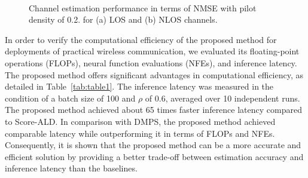 \documentclass[lettersize,journal]{IEEEtran}
\begin{document}
\begin{figure}[!t]
\\
\caption{Channel estimation performance in terms of NMSE with pilot density of 0.2. for (a) LOS and (b) NLOS channels.}
\label{fig_sim_2}
\end{figure}

In order to verify the computational efficiency of the proposed method for deployments of practical wireless communication, we evaluated its floating-point operations (FLOPs), neural function evaluations (NFEs), and inference latency. The proposed method offers significant advantages in computational efficiency, as detailed in Table~\ref{tab:table1}. The inference latency was measured in the condition of a batch size of 100 and $\rho$ of 0.6, averaged over 10 independent runs. The proposed method achieved about 65 times faster inference latency compared to Score-ALD. In comparison with DMPS, the proposed method achieved comparable latency while outperforming it in terms of FLOPs and NFEs. Consequently, it is shown that the proposed method can be a more accurate and efficient solution by providing a better trade-off between estimation accuracy and inference latency than the baselines.
\end{document}

